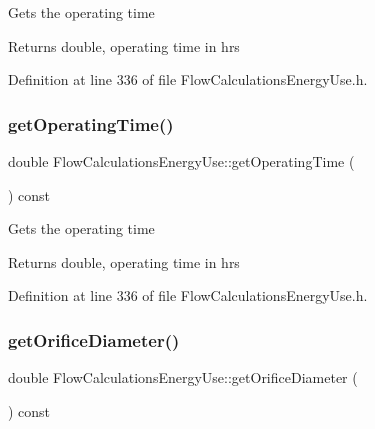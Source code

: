 Gets the operating time

\begin{DoxyReturn}{Returns}
double, operating time in hrs 
\end{DoxyReturn}


Definition at line 336 of file Flow\+Calculations\+Energy\+Use.\+h.

\mbox{\label{class_flow_calculations_energy_use_ab44c6cad4825e30f5599f18fcbfbb873}} 
\subsubsection{\texorpdfstring{get\+Operating\+Time()}{getOperatingTime()}\hspace{0.1cm}{\footnotesize\ttfamily [3/3]}}
{\footnotesize\ttfamily double Flow\+Calculations\+Energy\+Use\+::get\+Operating\+Time (\begin{DoxyParamCaption}{ }\end{DoxyParamCaption}) const\hspace{0.3cm}{\ttfamily [inline]}}

Gets the operating time

\begin{DoxyReturn}{Returns}
double, operating time in hrs 
\end{DoxyReturn}


Definition at line 336 of file Flow\+Calculations\+Energy\+Use.\+h.

\mbox{\label{class_flow_calculations_energy_use_a71c34f09ec3524db321b8934930700c5}} 
\subsubsection{\texorpdfstring{get\+Orifice\+Diameter()}{getOrificeDiameter()}\hspace{0.1cm}{\footnotesize\ttfamily [1/3]}}
{\footnotesize\ttfamily double Flow\+Calculations\+Energy\+Use\+::get\+Orifice\+Diameter (\begin{DoxyParamCaption}{ }\end{DoxyParamCaption}) const\hspace{0.3cm}{\ttfamily [inline]}}

